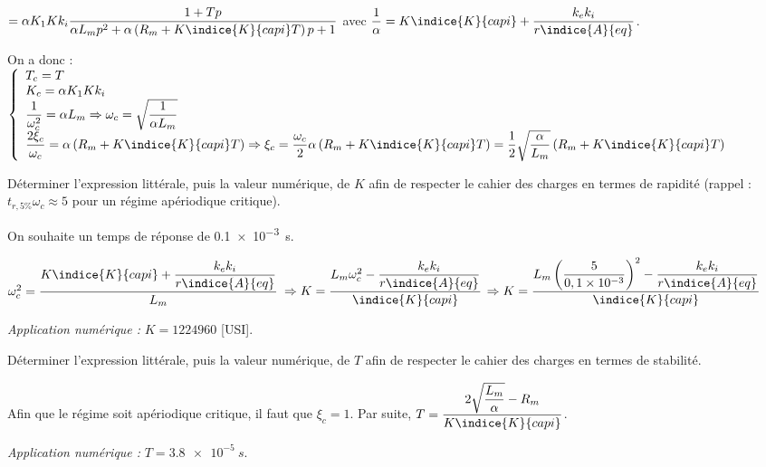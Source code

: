 \documentclass[11pt]{article}
\begin{document}
\begin{UPSTIcorrige}
$=\alpha K_1 Kk_i \dfrac{1+Tp }{\alpha L_mp^2 + \alpha\left(R_m+  K\indice{K}{capi}T\right) p+1} $ avec $\dfrac{1}{\alpha} = K\indice{K}{capi}+\dfrac{k_e k_i}{r\indice{A}{eq}}$.

On a donc : 
$
\left\{
\begin{array}{l}
T_c = T \\
K_c = \alpha K_1 Kk_i  \\
\dfrac{1}{\omega_c^2} = \alpha L_m \Rightarrow  \omega_c = \sqrt{\dfrac{1}{\alpha L_m}} \\
\dfrac{2 \xi_c}{\omega_c} = \alpha\left(R_m+  K\indice{K}{capi}T\right) 
\Rightarrow  \xi_c = \dfrac{\omega_c}{2}\alpha\left(R_m+  K\indice{K}{capi}T\right) = \dfrac{1}{2}\sqrt{\dfrac{\alpha}{ L_m}} \left(R_m+  K\indice{K}{capi}T\right)  \\
\end{array}
\right.
$
\end{UPSTIcorrige}

\UPSTIquestion Déterminer l'expression littérale, puis la valeur numérique, de $K$ afin de respecter le cahier des charges en termes de rapidité (rappel : $t_{r, 5 \%} \omega_{c} \approx 5$ pour un régime apériodique critique).

\begin{UPSTIcorrige}
On souhaite un temps de réponse de \SI{0,1e-3}{s}. 

$\omega_c^2  = \dfrac{K\indice{K}{capi}+\dfrac{k_e k_i}{r\indice{A}{eq}}}{L_m} $
$\Rightarrow K = \dfrac{L_m\omega_c^2 - \dfrac{k_e k_i}{r\indice{A}{eq}}}{\indice{K}{capi}}$
$\Rightarrow K = \dfrac{L_m\left(\dfrac{5}{0,1 \times 10^{-3}} \right)^2 - \dfrac{k_e k_i}{r\indice{A}{eq}}}{\indice{K}{capi}}$

\textit{Application numérique : } $K=1224960$ [USI].
\end{UPSTIcorrige}

\UPSTIquestion Déterminer l'expression littérale, puis la valeur numérique, de $T$ afin de respecter le cahier des charges en termes de stabilité.

\begin{UPSTIcorrige}
Afin que le régime soit apériodique critique, il faut que $\xi_c = 1$. 
Par suite, $    T = \dfrac{2\sqrt{\dfrac{ L_m}{\alpha}} - R_m }{K\indice{K}{capi}} $.

\textit{Application numérique : } $T=\SI{3,8e-5}{s}$.
\end{UPSTIcorrige}
\end{document}
